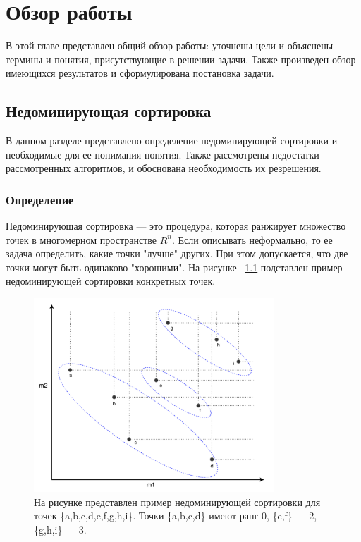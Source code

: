 
\chapter{Обзор работы}
\label{chapter1}

В этой главе представлен общий обзор работы: уточнены цели и объяснены термины и понятия, присутствующие в решении задачи. Также произведен обзор имеющихся результатов и сформулирована постановка задачи.

\section{Недоминирующая сортировка}

В данном разделе представлено определение недоминирующей сортировки и необходимые для ее понимания понятия. Также рассмотрены недостатки рассмотренных алгоритмов, и обоснована необходимость их резрешения.

\subsection{Определение}

Недоминирующая сортировка {---} это процедура, которая ранжирует множество точек в многомерном пространстве $R^n$.
Если описывать неформально, то ее задача определить, какие точки "лучше" других. При этом допускается, что две точки
могут быть одинаково "хорошими". На рисунке ~\ref{nds} подставлен пример недоминирующей сортировки конкретных точек.

\begin{figure}[!h]
\begin{center}
\includegraphics[width=9cm]{pic/non_dominated_sort.png}
\caption{На рисунке представлен пример недоминирующей сортировки для точек \{a,b,c,d,e,f,g,h,i\}.
Точки \{a,b,c,d\} имеют ранг 0, \{e,f\} {---} 2, \{g,h,i\} {---} 3.}
\label{nds}
\end{center}
\end{figure}

